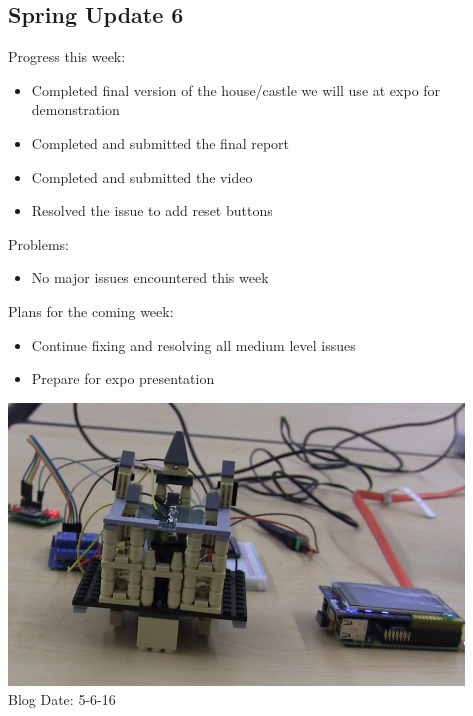 \subsection{Spring Update 6}
Progress this week:
\begin{itemize}
   \item Completed final version of the house/castle we will use at expo for demonstration
   \item Completed and submitted the final report
   \item Completed and submitted the video
   \item Resolved the issue to add reset buttons
\end{itemize}
Problems:
\begin{itemize}
   \item No major issues encountered this week
\end{itemize}
Plans for the coming week:
\begin{itemize}
   \item Continue fixing and resolving all medium level issues
   \item Prepare for expo presentation
\end{itemize}
\includegraphics[scale=0.5]{castle}\\
Blog Date: 5-6-16

